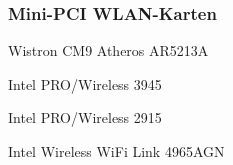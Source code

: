 \subsubsection{Mini-PCI WLAN-Karten}

\begin{wlandevice}{Wistron CM9 Atheros AR5213A}
\wlanchipset
\wlanieeestandard
\wlanmode
\wlansecurity
\wlandriver
\wlanprice
\wlaninstall
\end{wlandevice}

\begin{wlandevice}{Intel PRO/Wireless 3945}
\wlanchipset
\wlanieeestandard
\wlanmode
\wlansecurity
\wlandriver
\wlanprice
\wlaninstall
\end{wlandevice}

\begin{wlandevice}{Intel PRO/Wireless 2915}
\wlanchipset
\wlanieeestandard
\wlanmode
\wlansecurity
\wlandriver
\wlanprice
\wlaninstall
\end{wlandevice}

\begin{wlandevice}{Intel Wireless WiFi Link 4965AGN}
\wlanchipset
\wlanieeestandard
\wlanmode
\wlansecurity
\wlandriver
\wlanprice
\wlaninstall
\end{wlandevice}
